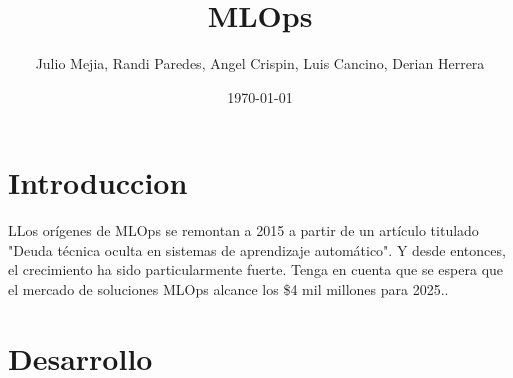 \documentclass[twoside,twocolumn]{article}
\title{MLOps}
\author{Julio Mejia, Randi Paredes, Angel Crispin, Luis Cancino, Derian Herrera}
\date{\today}
\begin{document}
\maketitle


\section{Introduccion}
\lettrine[nindent=0em,lines=3]{L}Los orígenes de MLOps se remontan a 2015 a partir de un artículo titulado "Deuda técnica oculta en sistemas de aprendizaje automático". Y desde entonces, el crecimiento ha sido particularmente fuerte. Tenga en cuenta que se espera que el mercado de soluciones MLOps alcance los \$4 mil millones para 2025..


\section{Desarrollo}
\end{document}
